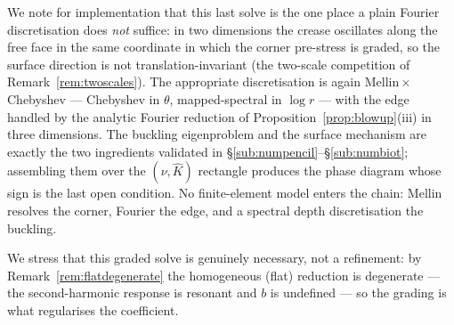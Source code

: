 We note for implementation that this last solve is the one place a plain Fourier discretisation does \emph{not} suffice:
in two dimensions the crease oscillates along the free face in the same coordinate in which the corner pre-stress is
graded, so the surface direction is not translation-invariant (the two-scale competition of
Remark~\ref{rem:twoscales}). The appropriate discretisation is again Mellin\,$\times$\,Chebyshev --- Chebyshev in
$\theta$, mapped-spectral in $\log r$ --- with the edge handled by the analytic Fourier reduction of
Proposition~\ref{prop:blowup}(iii) in three dimensions. The buckling eigenproblem and the surface mechanism are exactly
the two ingredients validated in \S\ref{sub:numpencil}--\S\ref{sub:numbiot}; assembling them over the
$(\nu,\hat K)$ rectangle produces the phase diagram whose sign is the last open condition. No finite-element model enters
the chain: Mellin resolves the corner, Fourier the edge, and a spectral depth discretisation the buckling.

We stress that this graded solve is genuinely necessary, not a refinement: by Remark~\ref{rem:flatdegenerate} the
homogeneous (flat) reduction is degenerate --- the second-harmonic response is resonant and $b$ is undefined --- so the
grading is what regularises the coefficient.


